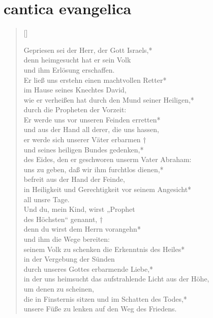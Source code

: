 
\thispagestyle{plain}



\section{cantica evangelica}



\begin{verse}[\versewidth]


Gepriesen sei der Herr, der Gott Israels,*\\
denn heimgesucht hat er sein Volk\\
und ihm Erlösung erschaffen.\\
\vin Er ließ uns erstehn einen machtvollen Retter*\\
\vin im Hause seines Knechtes David,\\
wie er verheißen hat durch den Mund seiner Heiligen,*\\
durch die Propheten der Vorzeit:\\
 \vin Er werde uns vor unseren Feinden erretten*\\
\vin und aus der Hand all derer, die uns hassen,\\
er werde sich unserer Väter erbarmen †\\
und seines heiligen Bundes gedenken,*\\
des Eides, den er geschworen unserm Vater Abraham:\\
\vin uns zu geben, daß wir ihm furchtlos dienen,*\\
\vin befreit aus der Hand der Feinde,\\
in Heiligkeit und Gerechtigkeit vor seinem Angesicht*\\
all unsre Tage.\\

\vin Und du, mein Kind, wirst „Prophet\\ 
\vin des Höchsten“ genannt, †\\
\vin denn du wirst dem Herrn vorangehn*\\
\vin und ihm die Wege bereiten:\\
seinem Volk zu schenken die Erkenntnis des Heiles*\\
in der Vergebung der Sünden\\
\vin durch unseres Gottes erbarmende Liebe,*\\
\vin in der uns heimsucht das aufstrahlende Licht aus der Höhe,\\
um denen zu scheinen,\\
die in Finsternis sitzen und im Schatten des Todes,*\\
 unsere Füße zu lenken auf den Weg des Friedens.\\

 
\end{verse}

